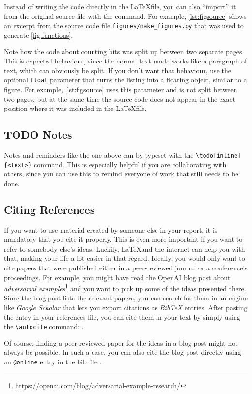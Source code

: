 \documentclass[11pt]{article}
\begin{document}
Instead of writing the code directly in the \LaTeX file, you can also ``import'' it from the original source file with the \verb|| command. For example, \cref{lst:figsource} shows an excerpt from the source code file \verb|figures/make_figures.py| that was used to generate \cref{fig:functions}.

Note how the code about counting bits was split up between two separate pages. This is expected behaviour, since the normal text mode works like a paragraph of text, which can obviously be split. If you don't want that behaviour, use the optional \verb|float| parameter that turns the listing into a floating object, similar to a figure. For example, \cref{lst:figsource} uses this parameter and is not split between two pages, but at the same time the source code does not appear in the exact position where it was included in the \LaTeX file.



\subsection{TODO Notes}
Notes and reminders like the one above can by typeset with the \verb|\todo[inline]{<text>}| command. This is especially helpful if you are collaborating with others, since you can use this to remind everyone of work that still needs to be done.

\subsection{Citing References}
If you want to use material created by someone else in your report, it is mandatory that you cite it properly. This is even more important if you want to refer to somebody else's ideas. Luckily, \LaTeX and the internet can help you with that, making your life a lot easier in that regard. Ideally, you would only want to cite papers that were published either in a peer-reviewed journal or a conference's proceedings. For example, you might have read the OpenAI blog post about \emph{adversarial examples}\footnote{\url{https://openai.com/blog/adversarial-example-research/}} and you want to pick up some of the ideas presented there. Since the blog post lists the relevant papers, you can search for them in an engine like \emph{Google Scholar} that lets you export citations as \emph{BibTeX} entries. After pasting the entry in your references file, you can cite them in your text by simply using the \verb|\autocite| command: \autocite{papernot2017practical}.

Of course, finding a peer-reviewed paper for the ideas in a blog post might not always be possible. In such a case, you can also cite the blog post directly using an \verb|@online| entry in the bib file \autocite{goodfellow2017attacking}. 

\printbibliography
\end{document}
